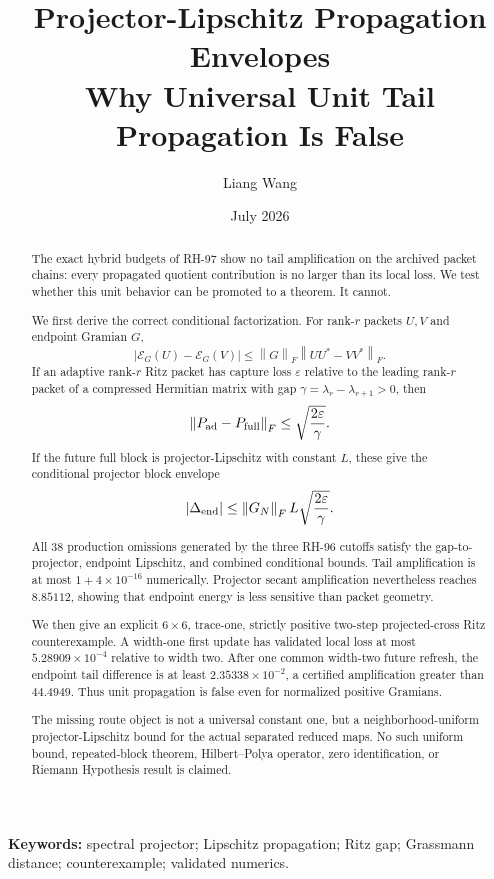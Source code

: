 \documentclass[11pt]{article}
\title{Projector-Lipschitz Propagation Envelopes\\
\large Why Universal Unit Tail Propagation Is False}
\author{Liang Wang}
\date{July 2026}
\theoremstyle{definition}
\theoremstyle{remark}
\newcommand{\norm}[1]{\left\lVert#1\right\rVert}
\newcommand{\E}{\mathcal E}
\begin{document}
\maketitle

\begin{abstract}
The exact hybrid budgets of RH-97 show no tail amplification on the archived
packet chains: every propagated quotient contribution is no larger than its
local loss.  We test whether this unit behavior can be promoted to a theorem.
It cannot.

We first derive the correct conditional factorization.  For rank-$r$ packets
$U,V$ and endpoint Gramian $G$,
\[
 |\E_G(U)-\E_G(V)|
 \le\norm G_F\norm{UU^*-VV^*}_F.
\]
If an adaptive rank-$r$ Ritz packet has capture loss $\varepsilon$ relative
to the leading rank-$r$ packet of a compressed Hermitian matrix with gap
$\gamma=\lambda_r-\lambda_{r+1}>0$, then
\[
 \norm{P_{\rm ad}-P_{\rm full}}_F
 \le\sqrt{\frac{2\varepsilon}{\gamma}}.
\]
If the future full block is projector-Lipschitz with constant $L$, these give
the conditional projector block envelope
\[
 |\Delta_{\rm end}|
 \le\norm{G_N}_F L\sqrt{\frac{2\varepsilon}{\gamma}}.
\]

All 38 production omissions generated by the three RH-96 cutoffs satisfy the
gap-to-projector, endpoint Lipschitz, and combined conditional bounds.  Tail
amplification is at most $1+4\times10^{-16}$ numerically.  Projector secant
amplification nevertheless reaches $8.85112$, showing that endpoint energy is
less sensitive than packet geometry.

We then give an explicit $6\times6$, trace-one, strictly positive two-step
projected-cross Ritz counterexample.  A width-one first update has validated
local loss at most $5.28909\times10^{-4}$ relative to width two.  After one
common width-two future refresh, the endpoint tail difference is at least
$2.35338\times10^{-2}$, a certified amplification greater than $44.4949$.
Thus unit propagation is false even for normalized positive Gramians.

The missing route object is not a universal constant one, but a
neighborhood-uniform projector-Lipschitz bound for the actual separated
reduced maps.  No such uniform bound, repeated-block theorem, Hilbert--Polya
operator, zero identification, or Riemann Hypothesis result is claimed.
\end{abstract}

\noindent\textbf{Keywords:} spectral projector; Lipschitz propagation; Ritz
gap; Grassmann distance; counterexample; validated numerics.
\end{document}
